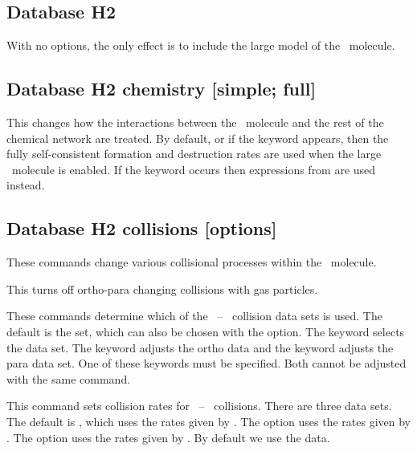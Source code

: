 \subsection{Database H2}

With no options, the only effect is to include the large model of the
\htwo\ molecule.

\subsection{Database H2 chemistry [simple; full]}

This changes how the interactions between the \htwo\ molecule
and the rest of the chemical network are treated.
By default, or if the keyword
appears, then the fully self-consistent formation and destruction rates
are used when the large \htwo\ molecule is enabled.
If the keyword
 occurs
then expressions from \citet{Tielens1985a} are used instead.

\subsection{Database H2 collisions [options]}
\label{sec:CommandH2CollisionsOptions}

These commands change various collisional processes within
the \htwo\ molecule.


This turns off
ortho-para changing
collisions with gas particles.



These commands determine which of the \htwo\ -- \htwo\ collision data
sets is used.
The default is the \citet{LeeH2H22008} set, which can also
be chosen with the  option.
The keyword  selects the
\citet{LeBourlot1999} data set.
The keyword  adjusts the ortho data and the
keyword  adjusts the para data set.
One of these keywords must be specified.  Both cannot be adjusted
with the same command.


This command sets collision rates for \htwo\ -- \hO\ collisions.
There are three data sets.
The default is , which uses the rates given by \citet{Wrathmall2007}.
The  option uses the rates given by \citet{LeBourlot1999}.   
The  option uses the rates given by \citet{2015MNRAS.453..810L}.
By default we use the \citet{Wrathmall2007} data.

